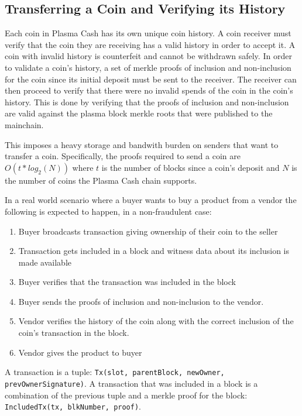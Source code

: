 \subsection{Transferring a Coin and Verifying its History}
\label{verify_coin_history}
Each coin in Plasma Cash has its own unique coin history. A coin receiver  must
verify that the coin they are receiving has a valid history in order to accept 
it. A coin with invalid history is counterfeit
and cannot be withdrawn safely. In order to validate a coin's
history, a set of merkle proofs of inclusion
and non-inclusion for the coin since its initial deposit must be sent to the receiver. The receiver can then
proceed to verify that there were no invalid spends of the coin in the coin's
history. This is done by verifying that the proofs of inclusion and non-inclusion are valid
against the plasma block merkle roots that were published to the mainchain.

This imposes a heavy storage and bandwith burden on senders that 
want to transfer a coin. Specifically, the proofs required to send a coin are 
$O(t * log_{2}(N))$ where $t$ is the number of blocks since a coin's deposit and $N$ is the number
of coins the Plasma Cash chain supports.

In a real world scenario where a buyer wants to buy a product from a vendor the
following is expected to happen, in a non-fraudulent case:
\begin{enumerate}
    \item Buyer broadcasts transaction giving ownership of their coin to the
        seller
    \item Transaction gets included in a block and witness data about its inclusion is made available
    \item Buyer verifies that the transaction was included in the block
    \item Buyer sends the proofs of inclusion and non-inclusion to the vendor.
    \item Vendor verifies the history of the coin along with the correct inclusion of the coin's transaction in the block.
    \item Vendor gives the product to buyer
\end{enumerate}

A transaction is a tuple: \texttt{Tx(slot, parentBlock, newOwner, prevOwnerSignature)}. A transaction that was included in a block is a combination of the previous tuple and a merkle proof for the block: \texttt{IncludedTx(tx, blkNumber, proof)}.

